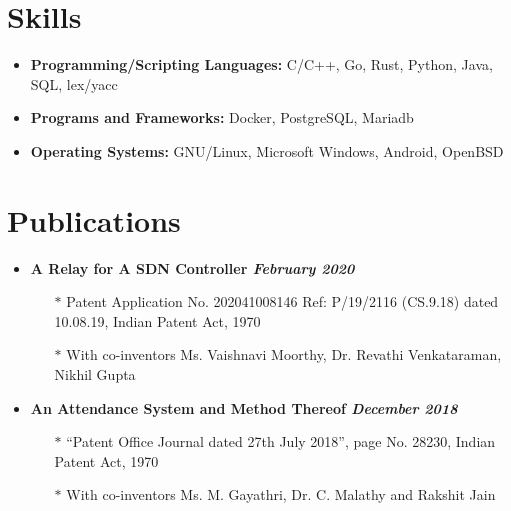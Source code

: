 \documentclass[10pt,a4paper]{article}
\begin{document}
\section{{\faCogs} Skills}
	\begin{itemize}[noitemsep,nolistsep]
		\item\textbf{Programming/Scripting Languages:} C/C++, Go, Rust, Python, Java, SQL, lex/yacc
		\item\textbf{Programs and Frameworks:} Docker, PostgreSQL, Mariadb
		\item\textbf{Operating Systems:} GNU/Linux, Microsoft Windows, Android, OpenBSD
	\end{itemize}


\section{{\faNewspaperO} Publications}
	\begin{itemize}[noitemsep,nolistsep]
		\item\textbf{A Relay for A SDN Controller \hfill \textit{February 2020}}
			\begin{itemize}[leftmargin=*]
				\setlength\itemsep{-0.25em}
				\item[$\ast$]Patent Application No. 202041008146 Ref: P/19/2116 (CS.9.18) dated 10.08.19, Indian Patent Act, 1970
				\item[$\ast$]With co-inventors Ms. Vaishnavi Moorthy, Dr. Revathi Venkataraman, Nikhil Gupta
			\end{itemize}
		\item\textbf{An Attendance System and Method Thereof \hfill \textit{December 2018}}
			\begin{itemize}[leftmargin=*]
				\setlength\itemsep{-0.25em}
				\item[$\ast$]``Patent Office Journal dated 27th July 2018'', page No. 28230, Indian Patent Act, 1970
				\item[$\ast$]With co-inventors Ms. M. Gayathri, Dr. C. Malathy and Rakshit Jain
			\end{itemize}
	\end{itemize}
\end{document}
